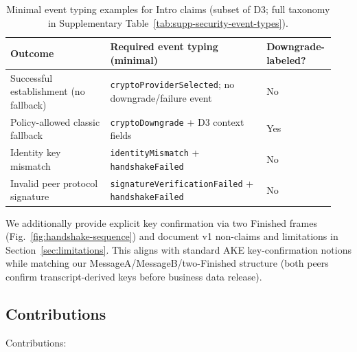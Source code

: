 \documentclass[10pt,journal,compsoc]{IEEEtran}
\begin{document}
\begin{table}[!t]
\centering
\scriptsize
\caption{Minimal event typing examples for Intro claims (subset of D3; full taxonomy in Supplementary Table~\ref{tab:supp-security-event-types}).}
\label{tab:intro-event-typing}
\begingroup
\setlength{\tabcolsep}{2pt}
\begin{tabular}{@{}p{0.30\linewidth}p{0.47\linewidth}p{0.17\linewidth}@{}}
\toprule
Outcome & Required event typing (minimal) & Downgrade-labeled? \\
\midrule
Successful establishment (no fallback) & \texttt{cryptoProviderSelected}; no downgrade/failure event & No \\
Policy-allowed classic fallback & \texttt{cryptoDowngrade} + D3 context fields & Yes \\
Identity key mismatch & \texttt{identityMismatch} + \texttt{handshakeFailed} & No \\
Invalid peer protocol signature & \texttt{signatureVerificationFailed} + \texttt{handshakeFailed} & No \\
\bottomrule
\end{tabular}
\endgroup
\end{table}

We additionally provide explicit key confirmation via two Finished
frames (Fig.~\ref{fig:handshake-sequence}) and document v1 non-claims and
limitations in Section~\ref{sec:limitations}.
This aligns with standard AKE key-confirmation notions while matching our
MessageA/MessageB/two-Finished structure (both peers confirm
transcript-derived keys before business data release).

\subsection{Contributions}\label{a.-contributions}

Contributions:
\end{document}
